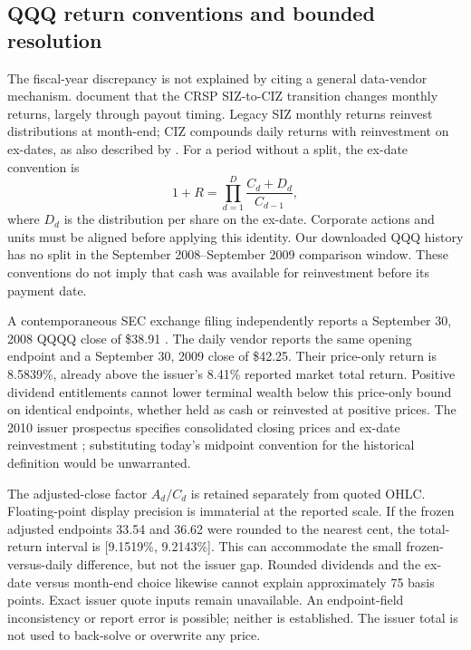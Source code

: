 \subsection{QQQ return conventions and bounded resolution}
The fiscal-year discrepancy is not explained by citing a general data-vendor mechanism. \citet{schwarz2026} document that the CRSP SIZ-to-CIZ transition changes monthly returns, largely through payout timing. Legacy SIZ monthly returns reinvest distributions at month-end; CIZ compounds daily returns with reinvestment on ex-dates, as also described by \citet{french2026ciz}. For a period without a split, the ex-date convention is
\[
 1+R=\prod_{d=1}^D\frac{C_d+D_d}{C_{d-1}},
\]
where $D_d$ is the distribution per share on the ex-date. Corporate actions and units must be aligned before applying this identity. Our downloaded QQQ history has no split in the September 2008--September 2009 comparison window. These conventions do not imply that cash was available for reinvestment before its payment date.

A contemporaneous SEC exchange filing independently reports a September 30, 2008 QQQQ close of \$38.91 \citep[p.~4]{sec2008close}. The daily vendor reports the same opening endpoint and a September 30, 2009 close of \$42.25. Their price-only return is 8.5839\%, already above the issuer's 8.41\% reported market total return. Positive dividend entitlements cannot lower terminal wealth below this price-only bound on identical endpoints, whether held as cash or reinvested at positive prices. The 2010 issuer prospectus specifies consolidated closing prices and ex-date reinvestment \citep[pp.~90--91]{qqq2010prospectus}; substituting today's midpoint convention for the historical definition would be unwarranted.


The adjusted-close factor $A_d/C_d$ is retained separately from quoted OHLC. Floating-point display precision is immaterial at the reported scale. If the frozen adjusted endpoints 33.54 and 36.62 were rounded to the nearest cent, the total-return interval is [9.1519\%, 9.2143\%]. This can accommodate the small frozen-versus-daily difference, but not the issuer gap. Rounded dividends and the ex-date versus month-end choice likewise cannot explain approximately 75 basis points. Exact issuer quote inputs remain unavailable. An endpoint-field inconsistency or report error is possible; neither is established. The issuer total is not used to back-solve or overwrite any price.

